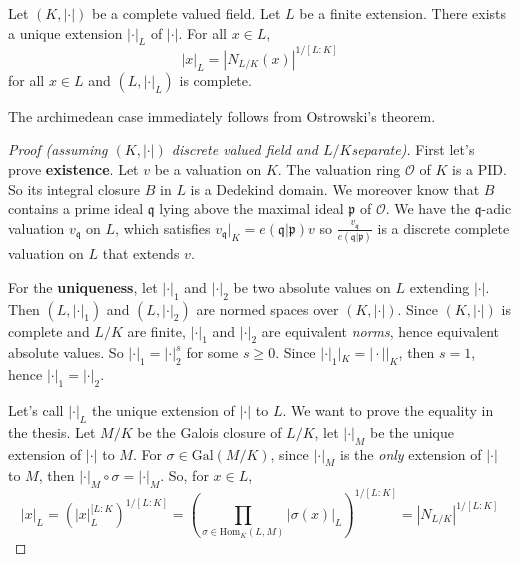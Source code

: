 \begin{theorem}{}
    Let \({(K, |\cdot |)}\) be a complete valued field. Let \(L\) be a finite
    extension. There exists a unique extension \(|\cdot |_L\) of \(|\cdot |\).
    For all \(x \in L\), 
    \[
    |x|_L = {| N_{L / K} {(x)} |}^{1 / [L:K]}
    \]
    for all \(x \in L\) and \({(L, |\cdot |_L)}\) is complete.
\end{theorem}
\begin{remark}{}
    The archimedean case immediately follows from Ostrowski's theorem.
\end{remark}
\begin{proof}[Proof (assuming \({(K, |\cdot |)}\) discrete
    valued field and \(L / K\)separate)] First let's prove \textbf{existence}.
    Let \(v\) be a valuation on \(K\). The valuation ring \(\mathcal{O}\) of
    \(K\) is a PID. So its integral closure \(B\) in \(L\) is a Dedekind domain.
    We moreover know that \(B\) contains a prime ideal \(\mathfrak{q}\) lying
    above the maximal ideal \(\mathfrak{p}\) of \(\mathcal{O}\). We have the
    \(\mathfrak{q}\)-adic valuation \(v_\mathfrak{q}\) on \(L\), which satisfies
    \( v_\mathfrak{q}|_K = e {(\mathfrak{q}|\mathfrak{p})} v \)
    so \(\frac{v_\mathfrak{q}}{e{(\mathfrak{q}|\mathfrak{p})}}\) is a discrete
    complete valuation on \(L\) that extends \(v\).

    For the \textbf{uniqueness}, let \(|\cdot |_1\) and \(|\cdot|_2\) be two
    absolute values on \(L\) extending \(|\cdot |\). Then \({(L, |\cdot |_1)}\)
    and \({(L,|\cdot |_2)}\) are normed spaces over \({(K, |\cdot |)}\). Since
    \({(K, |\cdot |)}\) is complete and \(L/K\) are finite, \(|\cdot |_1\) and
    \(|\cdot |_2\) are equivalent \emph{norms}, hence equivalent absolute
    values.
    So \(|\cdot|_1 = |\cdot|_2^{s}\) for some \(s\ge 0\). Since \(|\cdot |_1 |_K
    = |\cdot | |_K\), then \(s=1\), hence \(|\cdot |_1 = |\cdot |_2\).

    Let's call \(|\cdot |_L\) the unique extension of \(|\cdot |\) to \(L\). We
    want to prove the equality in the thesis. Let \(M / K\) be the Galois
    closure of \(L / K\), let \(|\cdot |_M\) be the unique extension of \(|\cdot
    |\) to \(M\). For \(\sigma \in \mathrm{Gal}{(M /K)}\), since \(|\cdot |_M\)
    is the \emph{only} extension of \(|\cdot |\) to \(M\), then \(|\cdot |_M
    \circ \sigma = |\cdot |_M\). So, for \(x \in L\),
    \[
        |x|_L = {\left( |x|_L ^{[L:K} \right)}^{1 / [L:K]} = {\left(
        \prod_{\sigma \in \mathrm{Hom}_K {(L, M)}} |\sigma{(x)}|_L \right)} ^{ 1
    / [L:K]} = {|N_{L / K}|}^{1 / [L : K]}
    \]

\end{proof}


